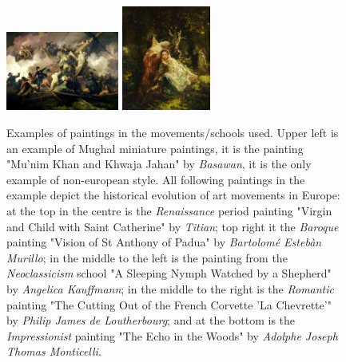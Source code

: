 \documentclass[11pt,a4paper,twoside,openright,draft]{report}
\begin{document}
\begin{multicols}{2}
\begin{figure}[tbp]
\includegraphics[width=0.33\textwidth]{loutherbourg_k264}
\includegraphics[width=0.26\textwidth]{monticelli_300}
\caption[Examples of paintings in art movements/schools]{Examples of paintings
in the movements/schools used.  Upper left is an example of Mughal miniature
paintings, it is the painting "Mu'nim Khan and Khwaja Jahan" by \emph{Basawan},
it is the only example of non-european style.  All following paintings in the
example depict the historical evolution of art movements in Europe: at the top
in the centre is the \emph{Renaissance} period painting "Virgin and Child with
Saint Catherine" by \emph{Titian};  top right it the \emph{Baroque} painting
"Vision of St Anthony of Padua" by \emph{Bartolom\'e Esteb\`an Murillo};  in
the middle to the left is the painting from the \emph{Neoclassicism} school "A
Sleeping Nymph Watched by a Shepherd" by \emph{Angelica Kauffmann}; in the
middle to the right is the \emph{Romantic} painting "The Cutting Out of the
French Corvette 'La Chevrette'" by \emph{Philip James de Loutherbourg}; and at
the bottom is the \emph{Impressionist} painting "The Echo in the Woods" by
\emph{Adolphe Joseph Thomas Monticelli}.}
\label{fig:styles}
\end{figure}

\end{multicols}

\end{document}
